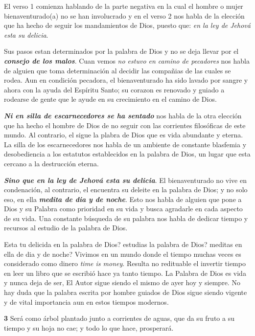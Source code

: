 El verso 1 comienza hablando de la parte negativa en la cual el hombre
o mujer bienaventurado(a) no se han involucrado y en el verso 2 nos
habla de la elección que ha hecho de seguir los mandamientos de Dios,
puesto que: \textit{en la ley de Jehová esta su delicia}.

Sus pasos estan determinados por la palabra de Dios y no se deja
llevar por el \textbf{\textit{consejo de los malos}}.  Cuan vemos
\textit{no estuvo en camino de pecadores} nos habla de alguien que toma
determinación al decidir las compañias de las cuales se rodea. Aun en
condición pecadora, el bienaventurado ha sido lavado por sangre y
ahora con la ayuda del Espíritu Santo; su corazon es renovado y guiado
a rodearse de gente que le ayude en su crecimiento en el camino de
Dios.

\textbf{\textit{Ni en silla de escarnecedores se ha sentado}} nos
habla de la otra elección que ha hecho el hombre de Dios de no seguir
con las corrientes filosóficas de este mundo. Al contrario, el sigue
la plabra de Dios que es vida abundante y eterna. La silla de los
escarnecedores nos habla de un ambiente de constante blasfemia y
desobediencia a los estatutos establecidos en la palabra de Dios, un
lugar que esta cercano a la destrucción eterna.

\textbf{\textit{Sino que en la ley de Jehová esta su delicia}}. El
bienaventurado no vive en condenación, al contrario, el encuentra su
deleite en la palabra de Dios; y no solo eso, en ella
\textbf{\textit{medita de dia y de noche}}. Esto nos habla de alguien
que pone a Dios y su Palabra como prioridad en su vida y busca agradarle en
cada aspecto de su vida. Una constante búsqueda de su palabra nos
habla de dedicar tiempo y recursos al estudio de la palabra de Dios.

Esta tu delicida en la palabra de Dios? estudias la palabra de Dios?
meditas en ella de dia y de noche? Vivimos en un mundo donde el tiempo
muchas veces es considerado como dinero \textit{time is money}.
Resulta no redituable el invertir tiempo en leer un libro
que se escribió hace ya tanto tiempo. La Palabra de Dios es vida y
nunca deja de ser, El Autor sigue siendo el mismo de ayer hoy y
siempre. No hay duda que la palabra escrita por hombre guiados de
Dios sigue siendo vigente y de vital importancia aun en estos tiempos modernos.

\begin{quotebox}
  \textbf{3} Será como árbol plantado junto a corrientes de aguas, que
  da su fruto a su tiempo y su hoja no cae; y todo lo que hace,
  prosperará.
\end{quotebox}

